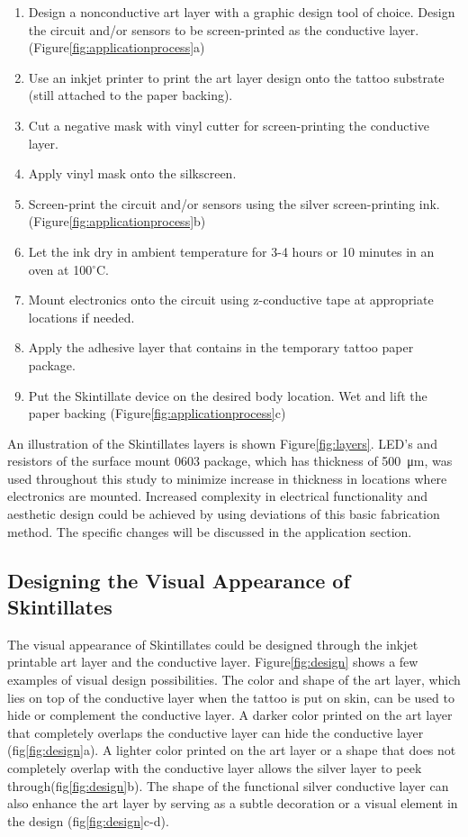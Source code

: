 \documentclass{sigchi}
\begin{document}
\begin{enumerate}
  \item Design a nonconductive art layer with a graphic design tool of choice. Design the circuit and/or sensors to be screen-printed as the conductive layer. (Figure\ref{fig:applicationprocess}a)
  \item Use an inkjet printer to print the art layer design onto the tattoo substrate (still attached to the paper backing). 
  \item Cut a negative mask with vinyl cutter for screen-printing the conductive layer. 
  \item Apply vinyl mask onto the silkscreen. 
  \item Screen-print the circuit and/or sensors using the silver screen-printing ink.(Figure\ref{fig:applicationprocess}b)
  \item Let the ink dry in ambient temperature for 3-4 hours or 10 minutes in an oven at 100$^{\circ}$C. 
  \item Mount electronics onto the circuit using z-conductive tape at appropriate locations if needed.   
  \item Apply the adhesive layer that contains in the temporary tattoo paper package. 
  \item Put the Skintillate device on the desired body location. Wet and lift the paper backing (Figure\ref{fig:applicationprocess}c)
\end{enumerate}
An illustration of the Skintillates layers is shown Figure\ref{fig:layers}. LED's and resistors of the surface mount 0603 package, which has thickness of  \SI{500}{\micro\metre}, was used throughout this study to minimize increase in thickness in locations where electronics are mounted. Increased complexity in electrical functionality and aesthetic design could be achieved by using deviations of this basic fabrication method. The specific changes will be discussed in the application section. 

\subsection{Designing the Visual Appearance of Skintillates}
The visual appearance of Skintillates could be designed through the inkjet printable art layer and the conductive layer. Figure\ref{fig:design} shows a few examples of visual design possibilities. The color and shape of the art layer, which lies on top of the conductive layer when the tattoo is put on skin, can be used to hide or complement the conductive layer. A darker color printed on the art layer that completely overlaps the conductive layer can hide the conductive layer (fig\ref{fig:design}a). A lighter color printed on the art layer or a shape that does not completely overlap with the conductive layer allows the silver layer to peek through(fig\ref{fig:design}b). The shape of the functional silver conductive layer can also enhance the art layer by serving as a subtle decoration or a visual element in the design (fig\ref{fig:design}c-d). 
\end{document}
